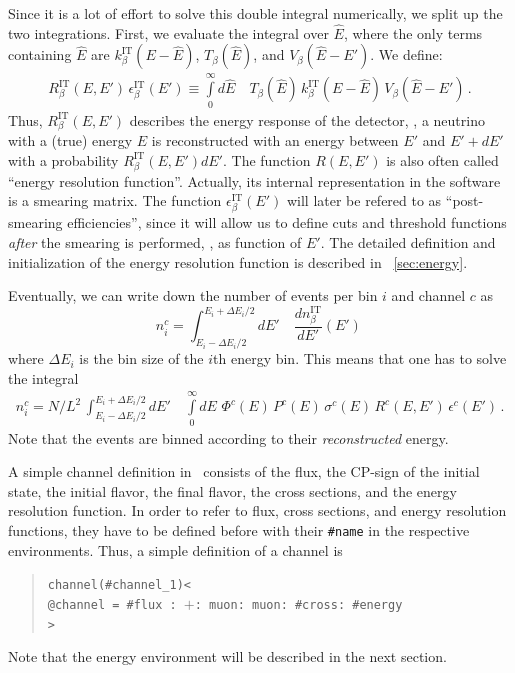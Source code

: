 Since it is a lot of effort to solve this double integral numerically,
we split up the two integrations. First, we evaluate the integral over
$\hat{E}$, where the only terms containing $\hat{E}$ are
$k_\beta^{\text{IT}}(E-\hat{E})$,  $ T_\beta(\hat{E})$, and 
$ V_\beta(\hat{E}-E')$. We define:
\begin{eqnarray}
\label{eq:e_res} 
R_\beta^{\text{IT}}(E,E')\,\epsilon_\beta^{\text{IT}}(E')
 \equiv
\int\limits_0^\infty d\hat{E} \quad T_\beta(\hat{E})\,k_\beta^{\text{IT}}(E-\hat{E})
\,V_\beta(\hat{E}-E')\,. 
\end{eqnarray}
Thus, $R_\beta^{\text{IT}}(E,E')$ describes the energy response of 
the detector, \ie , a neutrino with a (true) energy $E$ is reconstructed
with an energy between $E'$ and $E'+dE'$ with a probability
$R_\beta^{\text{IT}}(E,E') dE'$. The function $R(E,E')$ is also often called ``energy resolution function''. Actually, its internal representation
in the software is a smearing matrix. The function $\epsilon_\beta^{\text{IT}}(E')$ will later be refered to as ``post-smearing efficiencies'', since it will allow us to define cuts and threshold functions {\em after} the smearing is performed, \ie, as function of $E'$. The detailed definition and initialization of the energy resolution function is described in \Sec~\ref{sec:energy}.

Eventually, we can write down the number of events per bin $i$  and channel $c$ as
\begin{equation}
\label{eq:channel}
n_i^c=\int_{E_i-\Delta E_i/2}^{E_i+\Delta E_i/2} dE' \quad
\frac{dn_{\beta}^{\text{IT}}}{dE'} (E') \,
\end{equation}
where $\Delta E_i$ is the bin size of the $i$th energy bin.
This means that one has to solve the integral
\begin{eqnarray}
\label{eq:events_bin}
n_i^c=N/L^2\,\int_{E_i-\Delta E_i/2}^{E_i+\Delta E_i/2} dE' 
\quad \int\limits_0^\infty dE \,\, \Phi^c(E)\,
P^c(E)\,
\sigma^c(E)\,
R^c(E,E')\,
\epsilon^c(E')\,.
\end{eqnarray} 
Note that the events are binned according to their \emph{reconstructed} energy.

A simple channel definition in \GLOBES\ consists of the flux,
the CP-sign of the initial state, the initial flavor, the final flavor,
the cross sections, and the energy resolution function. In order to refer to
flux, cross sections, and energy resolution functions, they have to be 
defined before with their {\tt \#name} in the respective environments. 
Thus, a simple definition of a channel is
\begin{quote}
{\tt channel(\#channel\_1)<\\
\tb @channel = \#flux : $+$: muon: muon: \#cross: \#energy\\
>}
\end{quote}
Note that the energy environment will be described in the next section. 



